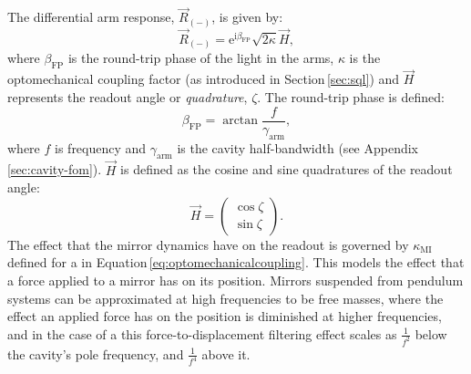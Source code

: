 The differential arm response, $\vec{R}_{\left( - \right)}$, is given by:
\begin{equation}
  \label{eq:fp-mich-response}
  \vec{R}_{\left( - \right)} = \text{e}^{\text{i} \beta_{\text{FP}}} \sqrt{2 \kappa} \vec{H},
\end{equation}
where $\beta_{\text{FP}}$ is the round-trip phase of the light in the arms, $\kappa$ is the optomechanical coupling factor (as introduced in Section\,\ref{sec:sql}) and $\vec{H}$ represents the readout angle or \emph{quadrature}, $\zeta$. The round-trip phase is defined:
\begin{equation}
  \beta_{\text{FP}} = \arctan{\frac{f}{\gamma_{\text{arm}}}},
\end{equation}
where $f$ is frequency and $\gamma_{\text{arm}}$ is the \FP{} cavity half-bandwidth (see Appendix\,\ref{sec:cavity-fom}). $\vec{H}$ is defined as the cosine and sine quadratures of the readout angle:
\begin{equation}
  \vec{H} =
  \begin{pmatrix}
    \cos \zeta \\
    \sin \zeta
  \end{pmatrix}.
\end{equation}
The effect that the mirror dynamics have on the readout is governed by $\kappa_{\text{MI}}$ defined for a \MI{} in Equation\,\ref{eq:optomechanicalcoupling}. This models the effect that a force applied to a mirror has on its position. Mirrors suspended from pendulum systems can be approximated at high frequencies to be free masses, where the effect an applied force has on the position is diminished at higher frequencies, and in the case of a \FPMI{} this force-to-displacement filtering effect scales as $\frac{1}{f^2}$ below the cavity's pole frequency, and $\frac{1}{f^4}$ above it.

